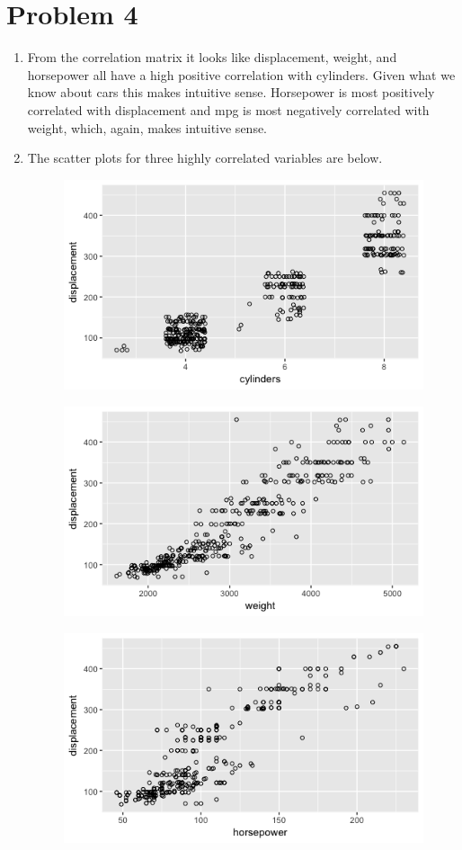\section*{Problem 4}

\begin{enumerate}
	\item From the correlation matrix it looks like displacement, weight, and horsepower all have a high positive correlation with cylinders. Given what we know about cars this makes intuitive sense. Horsepower is most positively correlated with displacement and mpg is most negatively correlated with weight, which, again, makes intuitive sense. 
	\item The scatter plots for three highly correlated variables are below. 
	\newline
	\begin{figure}[htbp]
		\centering
		\includegraphics[width=.8\linewidth]{img/ESL_02_disp_vs_cyl.png}
	\end{figure}
	\begin{figure}[htbp]
		\centering
		\includegraphics[width=.8\linewidth]{img/ESL_02_disp_vs_weight.png}
	\end{figure}
	\begin{figure}[htbp]
		\centering
		\includegraphics[width=.8\linewidth]{img/ESL_02_disp_vs_horsepower.png}

\end{figure}
\end{enumerate}
